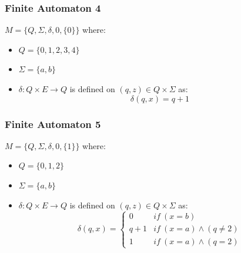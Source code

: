 \documentclass{math}
\begin{document}
\subsubsection*{Finite Automaton 4}
\( M = \{Q,\Sigma,\delta,0,\{0\}\} \) where:
\begin{itemize}
  \item \( Q = \{0,1,2,3,4\} \)
  \item \( \Sigma = \{a,b\} \)
  \item \( \delta: Q\times E\to Q \) is defined on \( (q,z)\in Q\times\Sigma \) as:
    \[ \delta(q,x) = q+1 \]
\end{itemize}

\subsubsection*{Finite Automaton 5}
\( M = \{Q,\Sigma,\delta,0,\{1\}\} \) where:
\begin{itemize}
  \item \( Q = \{0,1,2\} \)
  \item \( \Sigma = \{a,b\} \)
  \item \( \delta: Q\times E\to Q \) is defined on \( (q,z)\in Q\times\Sigma \) as:
    \[ \delta(q,x) = \begin{cases}
      0 & if\ (x = b) \\
      q+1 & if\ (x = a) \wedge (q \ne 2) \\
      1 & if\ (x = a) \wedge (q = 2)
    \end{cases} \]
\end{itemize}
\end{document}
